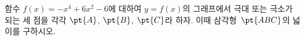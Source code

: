 함수 $f(x)=-x^4+6x^2-6$에 대하여 $y=f(x)$의 그래프에서 극대 또는 극소가 되는 세 점을 각각 $\pt{A}$, $\pt{B}$, $\pt{C}$라 하자. 이때 삼각형~$\pt{ABC}$의 넓이를 구하시오.
